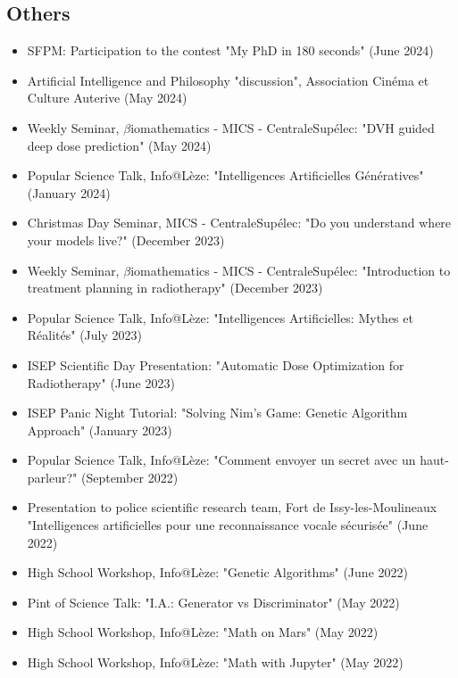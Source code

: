 \subsection*{Others}
\begin{itemize}
	\item SFPM: Participation to the contest "My PhD in 180 seconds" (June 2024)
	\item Artificial Intelligence and Philosophy "discussion", Association Cinéma et Culture Auterive (May 2024)
	\item Weekly Seminar, $\beta$iomathematics - MICS - CentraleSupélec: "DVH guided deep dose prediction" (May 2024) 
	\item Popular Science Talk, Info@Lèze: "Intelligences Artificielles Génératives" (January 2024)
	\item Christmas Day Seminar, MICS - CentraleSupélec: "Do you understand where your models live?" (December 2023)
	\item Weekly Seminar, $\beta$iomathematics - MICS - CentraleSupélec: "Introduction to treatment planning in radiotherapy" (December 2023) 
	\item Popular Science Talk, Info@Lèze: "Intelligences Artificielles: Mythes et Réalités" (July 2023)
	\item ISEP Scientific Day Presentation: "Automatic Dose Optimization for Radiotherapy" (June 2023)
	\item ISEP Panic Night Tutorial: "Solving Nim's Game: Genetic Algorithm Approach" (January 2023)
	\item Popular Science Talk, Info@Lèze: "Comment envoyer un secret avec un haut-parleur?" (September 2022)
	\item Presentation to police scientific research team, Fort de Issy-les-Moulineaux "Intelligences artificielles pour une reconnaissance vocale sécurisée" (June 2022)
	\item High School Workshop, Info@Lèze: "Genetic Algorithms" (June 2022)
	\item Pint of Science Talk: "I.A.: Generator vs Discriminator" (May 2022)
	\item High School Workshop, Info@Lèze: "Math on Mars" (May 2022)
	\item High School Workshop, Info@Lèze: "Math with Jupyter" (May 2022)
\end{itemize}

